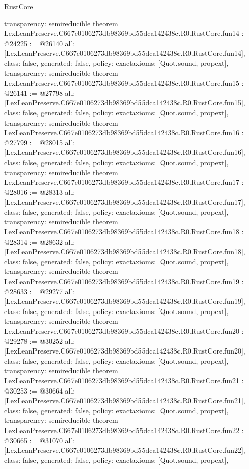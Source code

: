 \begin{lexlean}{RustCore}
\begin{coremodule}
{  transparency: semireducible
}
theorem LexLeanPreserve.C667e0106273db98369bd55dca142438c.R0.RustCore.fun14 : @24225 := @26140 {
  all: [LexLeanPreserve.C667e0106273db98369bd55dca142438c.R0.RustCore.fun14],
  class: false,
  generated: false,
  policy: exact{axioms: [Quot.sound, propext]},
  transparency: semireducible
}
theorem LexLeanPreserve.C667e0106273db98369bd55dca142438c.R0.RustCore.fun15 : @26141 := @27798 {
  all: [LexLeanPreserve.C667e0106273db98369bd55dca142438c.R0.RustCore.fun15],
  class: false,
  generated: false,
  policy: exact{axioms: [Quot.sound, propext]},
  transparency: semireducible
}
theorem LexLeanPreserve.C667e0106273db98369bd55dca142438c.R0.RustCore.fun16 : @27799 := @28015 {
  all: [LexLeanPreserve.C667e0106273db98369bd55dca142438c.R0.RustCore.fun16],
  class: false,
  generated: false,
  policy: exact{axioms: [Quot.sound, propext]},
  transparency: semireducible
}
theorem LexLeanPreserve.C667e0106273db98369bd55dca142438c.R0.RustCore.fun17 : @28016 := @28313 {
  all: [LexLeanPreserve.C667e0106273db98369bd55dca142438c.R0.RustCore.fun17],
  class: false,
  generated: false,
  policy: exact{axioms: [Quot.sound, propext]},
  transparency: semireducible
}
theorem LexLeanPreserve.C667e0106273db98369bd55dca142438c.R0.RustCore.fun18 : @28314 := @28632 {
  all: [LexLeanPreserve.C667e0106273db98369bd55dca142438c.R0.RustCore.fun18],
  class: false,
  generated: false,
  policy: exact{axioms: [Quot.sound, propext]},
  transparency: semireducible
}
theorem LexLeanPreserve.C667e0106273db98369bd55dca142438c.R0.RustCore.fun19 : @28633 := @29277 {
  all: [LexLeanPreserve.C667e0106273db98369bd55dca142438c.R0.RustCore.fun19],
  class: false,
  generated: false,
  policy: exact{axioms: [Quot.sound, propext]},
  transparency: semireducible
}
theorem LexLeanPreserve.C667e0106273db98369bd55dca142438c.R0.RustCore.fun20 : @29278 := @30252 {
  all: [LexLeanPreserve.C667e0106273db98369bd55dca142438c.R0.RustCore.fun20],
  class: false,
  generated: false,
  policy: exact{axioms: [Quot.sound, propext]},
  transparency: semireducible
}
theorem LexLeanPreserve.C667e0106273db98369bd55dca142438c.R0.RustCore.fun21 : @30253 := @30664 {
  all: [LexLeanPreserve.C667e0106273db98369bd55dca142438c.R0.RustCore.fun21],
  class: false,
  generated: false,
  policy: exact{axioms: [Quot.sound, propext]},
  transparency: semireducible
}
theorem LexLeanPreserve.C667e0106273db98369bd55dca142438c.R0.RustCore.fun22 : @30665 := @31070 {
  all: [LexLeanPreserve.C667e0106273db98369bd55dca142438c.R0.RustCore.fun22],
  class: false,
  generated: false,
  policy: exact{axioms: [Quot.sound, propext]},
}
\end{coremodule}
\end{lexlean}
